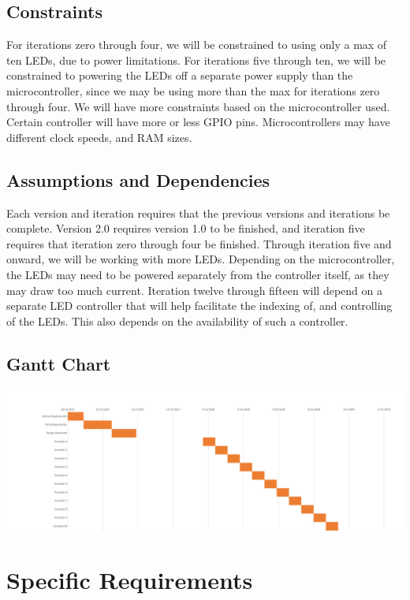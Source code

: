 \documentclass[onecolumn, draftclsnofoot,10pt, compsoc]{IEEEtran}
\begin{document}
		\subsection{Constraints}
		For iterations zero through four, we will be constrained to using only a max of ten LEDs, due to power limitations. For iterations five through ten, we will be constrained to powering the LEDs off a separate power supply than the microcontroller,
		since we may be using more than the max for iterations zero through four. We will have more constraints based on the microcontroller used. Certain controller will have more or less GPIO pins. Microcontrollers may have different clock speeds, and RAM sizes.

		\subsection{Assumptions and Dependencies}
		Each version and iteration requires that the previous versions and iterations be complete. Version 2.0 requires version 1.0 to be finished, and iteration five requires that iteration zero through four be finished.
		Through iteration five and onward, we will be working with more LEDs. Depending on the microcontroller, the LEDs may need to be powered separately from the controller itself, as they may draw too much current.
		Iteration twelve through fifteen will depend on a separate LED controller that will help facilitate the indexing of, and controlling of the LEDs. This also depends on the availability of such a controller.

		\newpage
		\begin{landscape}
		\subsection{Gantt Chart}
		\includegraphics[width=\linewidth]{Gant.png}
		\end{landscape}
		\newpage


	\section{Specific Requirements}
\end{document}
